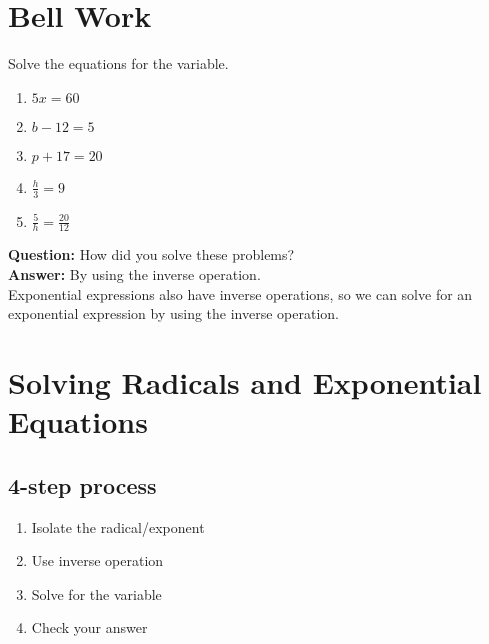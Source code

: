 \documentclass[12pt]{article}
\begin{document}
\section*{Bell Work}

Solve the equations for the variable.\\

\begin{enumerate}

	\item $5x=60$\\
	
	\item $b-12=5$\\
	
	\item $p+17=20$\\
	
	\item $\frac{h}{3}=9$\\
	
	\item $\frac{5}{h}=\frac{20}{12}$\\

\end{enumerate}

\textbf{Question:} How did you solve these problems?\\

\textbf{Answer:} By using the inverse operation.\\

Exponential expressions also have inverse operations, so we can solve for an exponential expression by using the inverse operation. \\

\pagebreak

\section{Solving Radicals and Exponential Equations}


\subsection{4-step process}

\begin{enumerate}

	\item Isolate the radical/exponent\\
	
	\item Use inverse operation\\
	
	\item Solve for the variable\\
	
	\item Check your answer\\
\end{enumerate}
\end{document}
